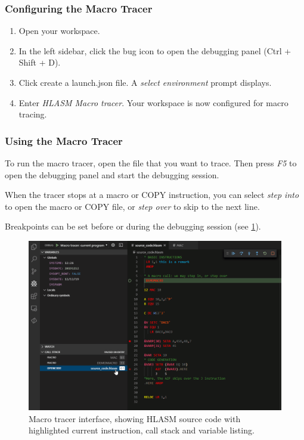 \subsubsection{Configuring the Macro Tracer}

\begin{enumerate}
	\item Open your workspace.
	\item In the left sidebar, click the bug icon to open the debugging panel (Ctrl + Shift + D).
	\item Click create a launch.json file. A \emph{select environment} prompt displays.
	\item Enter \emph{HLASM Macro tracer}. Your workspace is now configured for macro tracing.
\end{enumerate}

\subsubsection{Using the Macro Tracer}

To run the macro tracer, open the file that you want to trace. Then press \emph{F5} to open the debugging panel and start the debugging session.

When the tracer stops at a macro or COPY instruction, you can select \emph{step into} to open the macro or COPY file, or \emph{step over} to skip to the next line.

Breakpoints can be set before or during the debugging session (see \cref{fig:trac}).

\begin{figure}
	\centering
	\includegraphics[width=0.9\linewidth]{img/tracer/tracer-175}
	\caption{Macro tracer interface, showing HLASM source code with highlighted current instruction, call stack and variable listing.}
	\label{fig:trac}
\end{figure}
